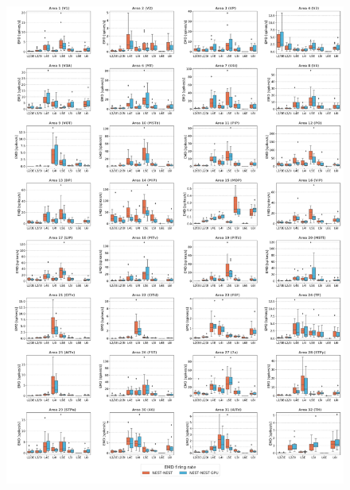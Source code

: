 \documentclass[a4paper, 12pt, twoside, openright]{book}
\begin{document}
\begin{figure}[H]
    \centering
    \includegraphics[width=\columnwidth]{figures/emd_boxplot_vert_ms_firing_rate.pdf}
\end{figure}
\end{document}
